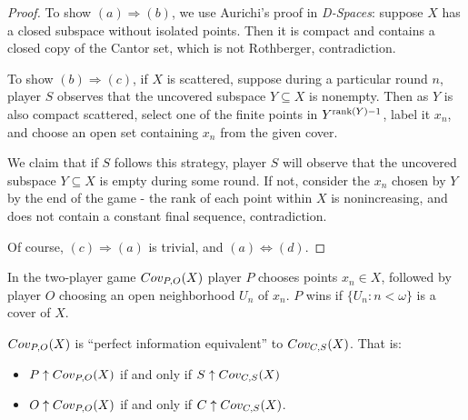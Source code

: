   \begin{proof}
    To show $(a)\Rightarrow(b)$, we use Aurichi's proof in \textit{D-Spaces}: suppose $X$ has a closed subspace without isolated points. Then it is compact and contains a closed copy of the Cantor set, which is not Rothberger, contradiction.

    To show $(b)\Rightarrow(c)$, if $X$ is scattered, suppose during a particular round $n$, player $S$ observes that the uncovered subspace $Y \subseteq X$ is nonempty. Then as $Y$ is also compact scattered,  select one of the finite points in $Y^{\textrm{rank}(Y)-1}$, label it $x_n$, and choose an open set containing $x_n$ from the given cover.

    We claim that if $S$ follows this strategy, player $S$ will observe that the uncovered subspace $Y\subseteq X$ is empty during some round. If not, consider the $x_n$ chosen by $Y$ by the end of the game - the rank of each point within $X$ is nonincreasing, and does not contain a constant final sequence, contradiction.

    Of course, $(c)\Rightarrow(a)$ is trivial, and $(a)\Leftrightarrow(d)$.
  \end{proof}

  \begin{definition}
    In the two-player game $Cov_{P,O}(X)$ player $P$ chooses points $x_n\in X$, followed by player $O$ choosing an open neighborhood $U_n$ of $x_n$. $P$ wins if $\{U_n:n<\omega\}$ is a cover of $X$.
  \end{definition}

  \begin{theorem} $Cov_{P,O}(X)$ is ``perfect information equivalent'' to $Cov_{C,S}(X)$. That is:

    \begin{itemize}
      \item $P\uparrow Cov_{P,O}(X)$ if and only if $S\uparrow Cov_{C,S}(X)$
      \item $O\uparrow Cov_{P,O}(X)$ if and only if $C\uparrow Cov_{C,S}(X)$.
    \end{itemize}
  \end{theorem}

